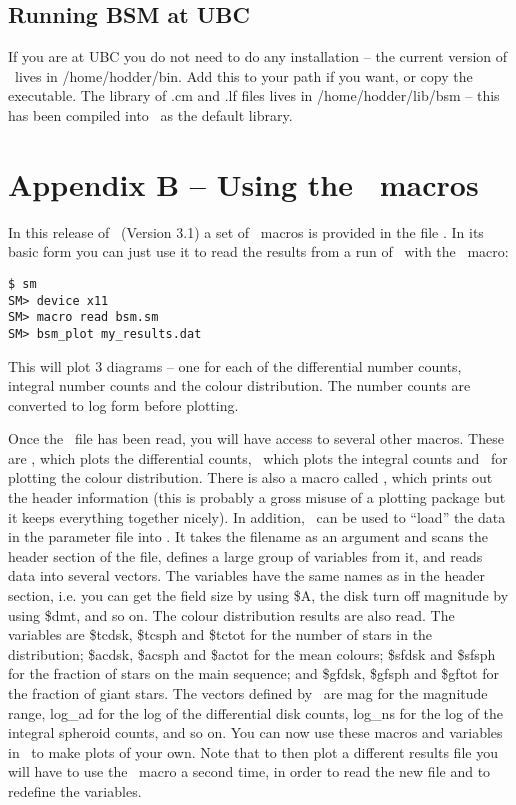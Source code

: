 \documentclass[11pt,twoside]{article}
\begin{document}
\subsection*{Running BSM at UBC}

If you are at UBC you do not need to do any installation -- the current
version of \bsm\ lives in  /home/hodder/bin. Add  this to your path if  you
want, or copy the executable.  The library of .cm and .lf files lives in 
/home/hodder/lib/bsm -- this  has  been compiled into \bsm\ as the default
library.
 

\section*{Appendix B -- Using the \sm\ macros}

In this release of \bsm\ (Version 3.1) a set of \sm\ macros is provided in
the file \bsmsm. In its basic form you can just use it to read the
results from a run of \bsm\ with the \bsmplot\ macro:
\begin{verbatim}
$ sm
SM> device x11
SM> macro read bsm.sm
SM> bsm_plot my_results.dat
\end{verbatim}
This will plot 3 diagrams -- one for each of the differential number
counts, integral number counts and the colour distribution. The number
counts are converted to log form before plotting. 

Once the \bsmsm\ file has been read, you will have
access to several other macros. These are \bsmdiff, which plots the
differential counts, \bsmint\ which plots the integral counts and
\bsmcol\ for plotting the colour  distribution. There is also a 
macro called \bsminfo, which prints  out the header information  (this
is probably a gross misuse of a plotting package but it keeps everything
together nicely). In addition, \bsmread\ can be used to ``load'' the data
in the parameter file into \sm. It takes the filename as an argument and
scans the header section of the file, defines a large group of variables
from it, and reads data into several vectors. The variables have the
same names as in the header section,  i.e. you can get the field size by
using \$A, the disk turn off
magnitude by using \$dmt, and so on. The colour distribution results are
also read. The variables are \$tcdsk, \$tcsph and \$tctot for the number of
stars  in the  distribution;  \$acdsk, \$acsph  and \$actot  for  the  mean
colours;  \$sfdsk and \$sfsph  for  the fraction  of  stars  on  the  main
sequence; and \$gfdsk, \$gfsph and \$gftot for the fraction of giant stars.
The vectors defined by \bsmread\ are mag for the magnitude range,
log\_ad for the log of the differential disk counts, log\_ns for the log
of the integral spheroid counts, and so on.
You can now use these macros and  variables in \sm\ to  make plots of your
own. Note that to then plot a different results file you will have to
use the \bsmread\ macro a second time, in order to read the new file and to
redefine the variables.
\end{document}
